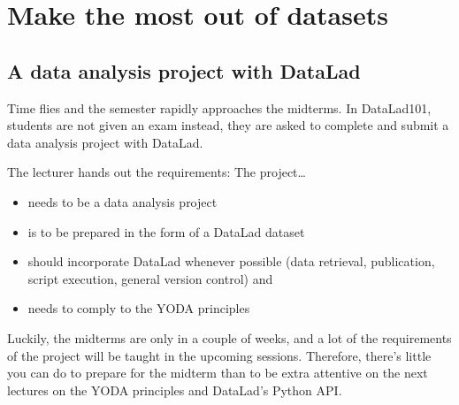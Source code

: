 \chapter{Make the most out of datasets}
\label{\detokenize{basics/basics-yoda:make-the-most-out-of-datasets}}\label{\detokenize{basics/basics-yoda:chapter-yoda}}\label{\detokenize{basics/basics-yoda::doc}}

\sphinxstepscope


\section{A data analysis project with DataLad}
\label{\detokenize{basics/101-126-intro:a-data-analysis-project-with-datalad}}\label{\detokenize{basics/101-126-intro:intromidterm}}\label{\detokenize{basics/101-126-intro::doc}}
\sphinxAtStartPar
Time flies and the semester rapidly approaches the midterms.
In DataLad\sphinxhyphen{}101, students are not given an exam \textendash{} instead, they are
asked to complete and submit a data analysis project with DataLad.

\sphinxAtStartPar
The lecturer hands out the requirements: The project…
\begin{itemize}
\item {} 
\sphinxAtStartPar
needs to be a data analysis project

\item {} 
\sphinxAtStartPar
is to be prepared in the form of a DataLad dataset

\item {} 
\sphinxAtStartPar
should incorporate DataLad whenever possible (data retrieval, publication,
script execution, general version control) and

\item {} 
\sphinxAtStartPar
needs to comply to the YODA principles

\end{itemize}

\sphinxAtStartPar
Luckily, the midterms are only in a couple of weeks, and a lot of the
requirements of the project will be taught in the upcoming sessions.
Therefore, there’s little you can do to prepare for the midterm
than to be extra attentive on the next lectures on the YODA
principles and DataLad’s Python API.

\sphinxstepscope

